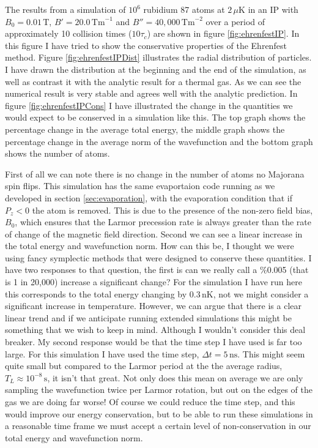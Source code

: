 The results from a simulation of $10^6$ rubidium 87 atoms at $2\,\mu\mathrm{K}$ in an IP with $B_0=0.01\,\mathrm{T}$, $B'=20.0\,\mathrm{Tm}^{-1}$ and $B''=40,000\,\mathrm{Tm}^{-2}$ over a period of approximately 10 collision times ($10\tau_c$) are shown in figure \ref{fig:ehrenfestIP}.
In this figure I have tried to show the conservative properties of the Ehrenfest method.
Figure \ref{fig:ehrenfestIPDist} illustrates the radial distribution of particles.
I have drawn the distribution at the beginning and the end of the simulation, as well as contrast it with the analytic result for a thermal gas.
As we can see the numerical result is very stable and agrees well with the analytic prediction.
In figure \ref{fig:ehrenfestIPCons} I have illustrated the change in the quantities we would expect to be conserved in a simulation like this.
The top graph shows the percentage change in the average total energy, the middle graph shows the percentage change in the average norm of the wavefunction and the bottom graph shows the number of atoms.

First of all we can note there is no change in the number of atoms \ie no Majorana spin flips.
This simulation has the same evaportaion code running as we developed in section \ref{sec:evaporation}, with the evaporation condition that if $P_z < 0$ the atom is removed.
This is due to the presence of the non-zero field bias, $B_0$, which ensures that the Larmor precession rate is always greater than the rate of change of the magnetic field direction.
Second we can see a linear increase in the total energy and wavefunction norm.
How can this be, I thought we were using fancy symplectic methods that were designed to conserve these quantities.
I have two responses to that question, the first is can we really call a \%0.005 (that is 1 in 20,000) increase a significant change?
For the simulation I have run here this corresponds to the total energy changing by $0.3\,\mathrm{nK}$, not we might consider a significant increase in temperature.
However, we can argue that there is a clear linear trend and if we anticipate running extended simulations this might be something that we wish to keep in mind.
Although I wouldn't consider this deal breaker.
My second response would be that the time step I have used is far too large.
For this simulation I have used the time step, $\Delta t = 5\,\mathrm{ns}$.
This might seem quite small but compared to the Larmor period at the the average radius, $T_L\approx 10^{-8}\,\mathrm{s}$, it isn't that great.
Not only does this mean on average we are only sampling the wavefunction twice per Larmor rotation, but out on the edges of the gas we are doing far worse!
Of course we could reduce the time step, and this would improve our energy conservation, but to be able to run these simulations in a reasonable time frame we must accept a certain level of non-conservation in our total energy and wavefunction norm.


